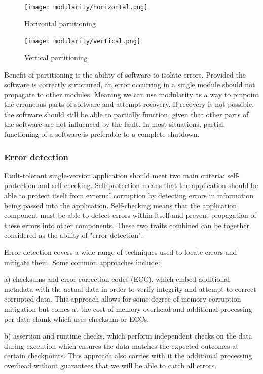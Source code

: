 \begin{figure}[hbt!]
    \centering
    \texttt{[image: modularity/horizontal.png]}
    \caption{Horizontal partitioning}
    \label{fig:mod_hor}
\end{figure}

\begin{figure}[hbt!]
    \centering
    \texttt{[image: modularity/vertical.png]}
    \caption{Vertical partitioning}
    \label{fig:mod_ver}
\end{figure}

Benefit of partitioning is the ability of software to isolate errors. Provided the software is correctly structured, an error occurring in a single module should not propagate to other modules. Meaning we can use modularity as a way to pinpoint the erroneous parts of software and attempt recovery. If recovery is not possible, the software should still be able to partially function, given that other parts of the software are not influenced by the fault. In most situations, partial functioning of a software is preferable to a complete shutdown.

\subsubsection{Error detection}

Fault-tolerant single-version application should meet two main criteria: self-protection and self-checking. Self-protection means that the application should be able to protect itself from external corruption by detecting errors in information being passed into the application. Self-checking means that the application component must be able to detect errors within itself and prevent propagation of these errors into other components. These two traits combined can be together considered as the ability of "error detection".

Error detection covers a wide range of techniques used to locate errors and mitigate them. Some common approaches include:

a) checksums and error correction codes (ECC), which embed additional metadata with the actual data in order to verify integrity and attempt to correct corrupted data. This approach allows for some degree of memory corruption mitigation but comes at the cost of memory overhead and additional processing per data-chunk which uses checksum or ECCs.

b) assertion and runtime checks, which perform independent checks on the data during execution which ensures the data matches the expected outcomes at certain checkpoints. This approach also carries with it the additional processing overhead without guarantees that we will be able to catch all errors.

